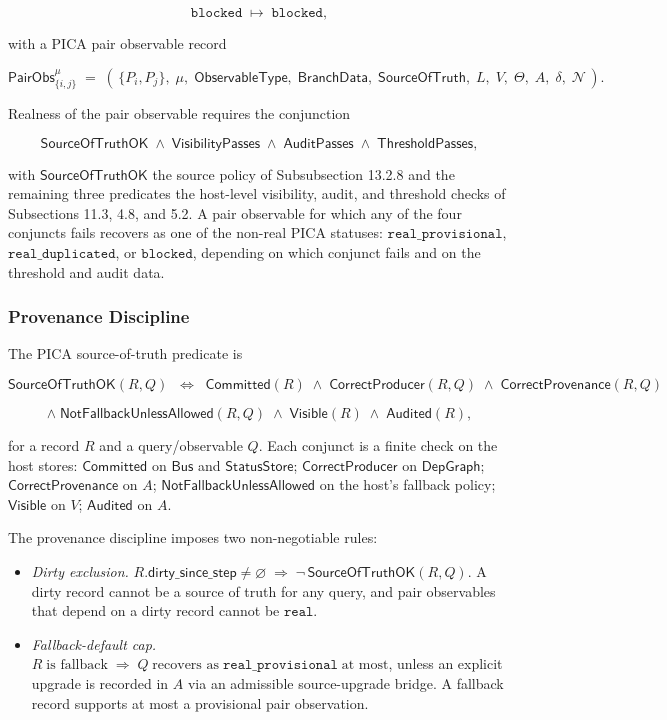 \documentclass[11pt]{article}
\providecommand{\tightlist}{}
\theoremstyle{definition}
\begin{document}
\[
\texttt{blocked}\;\longmapsto\;\texttt{blocked},
\]

with a PICA pair observable record

\[
\mathsf{PairObs}_{\{i,j\}}^{\mu}\;=\;(\,\{P_i,P_j\},\;\mu,\;\mathsf{ObservableType},\;\mathsf{BranchData},\;\mathsf{SourceOfTruth},\;L,\;V,\;\Theta,\;A,\;\delta,\;\mathcal N\,).
\]

Realness of the pair observable requires the conjunction

\[
\mathsf{SourceOfTruthOK}\;\land\;\mathsf{VisibilityPasses}\;\land\;\mathsf{AuditPasses}\;\land\;\mathsf{ThresholdPasses},
\]

with \(\mathsf{SourceOfTruthOK}\) the source policy of Subsubsection 13.2.8 and the remaining three predicates the host-level visibility, audit, and threshold checks of Subsections 11.3, 4.8, and 5.2. A pair observable for which any of the four conjuncts fails recovers as one of the non-real PICA statuses: \(\texttt{real\_provisional}\), \(\texttt{real\_duplicated}\), or \(\texttt{blocked}\), depending on which conjunct fails and on the threshold and audit data.

\subsubsection{Provenance Discipline}

The PICA source-of-truth predicate is

\[
\mathsf{SourceOfTruthOK}(R,Q)\;\;\Longleftrightarrow\;\;\mathsf{Committed}(R)\;\land\;\mathsf{CorrectProducer}(R,Q)\;\land\;\mathsf{CorrectProvenance}(R,Q)
\]

\[
\land\;\mathsf{NotFallbackUnlessAllowed}(R,Q)\;\land\;\mathsf{Visible}(R)\;\land\;\mathsf{Audited}(R),
\]

for a record \(R\) and a query/observable \(Q\). Each conjunct is a finite check on the host stores: \(\mathsf{Committed}\) on \(\mathsf{Bus}\) and \(\mathsf{StatusStore}\); \(\mathsf{CorrectProducer}\) on \(\mathsf{DepGraph}\); \(\mathsf{CorrectProvenance}\) on \(A\); \(\mathsf{NotFallbackUnlessAllowed}\) on the host's fallback policy; \(\mathsf{Visible}\) on \(V\); \(\mathsf{Audited}\) on \(A\).

The provenance discipline imposes two non-negotiable rules:

\begin{itemize}
\tightlist
\item
  \emph{Dirty exclusion.} \(R.\mathsf{dirty\_since\_step}\neq\varnothing\;\Longrightarrow\;\neg\,\mathsf{SourceOfTruthOK}(R,Q)\). A dirty record cannot be a source of truth for any query, and pair observables that depend on a dirty record cannot be \(\texttt{real}\).
\item
  \emph{Fallback-default cap.} \(R\;\text{is fallback}\;\Longrightarrow\;Q\;\text{recovers as}\;\texttt{real\_provisional}\;\text{at most}\), unless an explicit upgrade is recorded in \(A\) via an admissible source-upgrade bridge. A fallback record supports at most a provisional pair observation.
\end{itemize}
\end{document}
